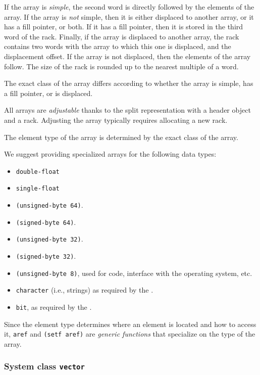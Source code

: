 If the array is \emph{simple}, the second word is directly followed
by the elements of the array.  If the array is \emph{not} simple, then
it is either displaced to another array, or it has a fill pointer, or
both.  If it has a fill pointer, then it is stored in the third word
of the rack.  Finally, if the array is displaced to another
array, the rack contains two words with the array to which
this one is displaced, and the displacement offset.  If the array is
not displaced, then the elements of the array follow.  The size of the
rack is rounded up to the nearest multiple of a word.

The exact class of the array differs according to whether the array is
simple, has a fill pointer, or is displaced.

All arrays are \emph{adjustable} thanks to the split representation
with a header object and a rack.  Adjusting the array
typically requires allocating a new rack.

The element type of the array is determined by the exact class of the
array.

We suggest providing specialized arrays for the following data types:

\begin{itemize}
\item \texttt{double-float}
\item \texttt{single-float}
\item \texttt{(unsigned-byte 64)}.
\item \texttt{(signed-byte 64)}.
\item \texttt{(unsigned-byte 32)}.
\item \texttt{(signed-byte 32)}.
\item \texttt{(unsigned-byte 8)}, used for code, interface with the
  operating system, etc.
\item \texttt{character} (i.e., strings) as required by the \hs{}.
\item \texttt{bit}, as required by the \hs{}.
\end{itemize}

Since the element type determines where an element is located and how
to access it, \texttt{aref} and \texttt{(setf aref)} are \emph{generic
  functions} that specialize on the type of the array.

\subsubsection{System class \texttt{vector}}

